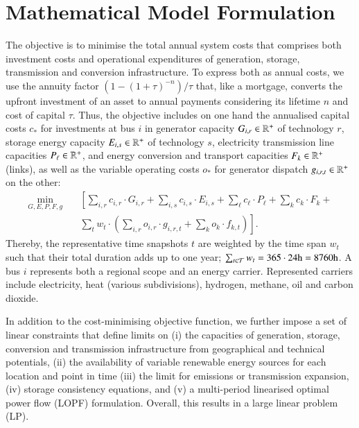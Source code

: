 \section{Mathematical Model Formulation}
\label{sec:si:math}

The objective is to minimise the total annual system costs that comprises both investment
costs and operational expenditures of generation, storage, transmission and
conversion infrastructure. To express both as annual costs, we use the annuity
factor $(1-(1+\tau)^{-n}) / \tau$ that, like a mortgage, converts the upfront
investment of an asset to annual payments considering its lifetime $n$ and cost
of capital $\tau$. Thus, the objective includes on one hand the annualised
capital costs $c_*$ for investments at bus $i$ in generator capacity
$G_{i,r}\in\mathbb{R}^+$ of technology $r$, storage energy capacity $E_{i,s}\in\mathbb{R}^+$ of
technology $s$, electricity transmission line capacities $P_{\ell}\in\mathbb{R}^+$, and
energy conversion and transport capacities $F_k\in\mathbb{R}^+$ (links), as well as the variable
operating costs $o_*$ for generator dispatch $g_{i,r,t}\in\mathbb{R}^+$ on the other:
\begin{align}
  \label{eq:objective}
  \min_{G,E,P,F,g} \quad &\left[\sum_{i,r} c_{i,r}\cdot G_{i,r} + \sum_{i,s} c_{i,s}\cdot E_{i,s} + \sum_{\ell}c_{\ell}\cdot P_{\ell}+ \sum_{k}c_{k}\cdot F_k +\right. \\
  & \left.  \sum_{t} w_t \cdot \left( \sum_{i,r} o_{i,r} \cdot g_{i,r,t} + \sum_k o_k \cdot f_{k,t} \right) \right].
\end{align}
Thereby, the representative time snapshots $t$ are weighted by the time span
$w_t$ such that their total duration adds up to one year; \mbox{$\sum_{t\in \mathcal{T}}
w_t=365\cdot 24\text{h}=8760\text{h}$}. A bus $i$ represents both a regional
scope and an energy carrier. Represented carriers include electricity, heat
(various subdivisions), hydrogen, methane, oil and carbon dioxide.


In addition to the cost-minimising objective function, we further impose a set
of linear constraints that define limits on (i) the capacities of generation,
storage, conversion and transmission infrastructure from geographical and
technical potentials, (ii) the availability of variable renewable energy sources
for each location and point in time (iii) the limit for \co emissions or transmission expansion, (iv)
storage consistency equations, and (v) a multi-period linearised optimal power
flow (LOPF) formulation. Overall, this results in a large linear problem (LP).

